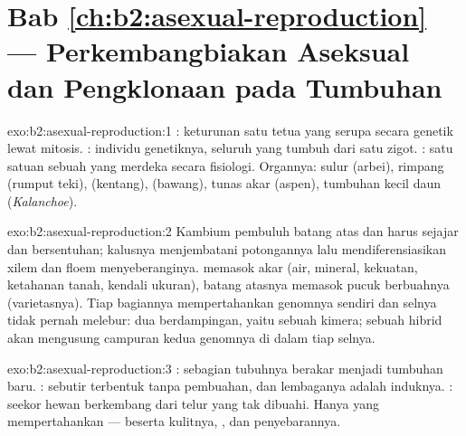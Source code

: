 \section*{Bab \ref{ch:b2:asexual-reproduction} --- Perkembangbiakan Aseksual dan Pengklonaan pada Tumbuhan}

\begin{solution}{exo:b2:asexual-reproduction:1}
: keturunan satu tetua yang serupa secara genetik lewat mitosis.
: individu genetiknya, seluruh yang tumbuh dari satu zigot.
: satu satuan sebuah  yang merdeka secara fisiologi.
Organnya: sulur (arbei), rimpang (rumput teki),  (kentang),
 (bawang), tunas akar (aspen), tumbuhan kecil daun
(\emph{Kalanchoe}).
\end{solution}

\begin{solution}{exo:b2:asexual-reproduction:2}
Kambium pembuluh batang atas dan  harus sejajar dan
bersentuhan; kalusnya menjembatani potongannya lalu
mendiferensiasikan xilem dan floem menyeberanginya. 
memasok akar (air, mineral, kekuatan, ketahanan tanah, kendali ukuran),
batang atasnya memasok pucuk berbuahnya (varietasnya). Tiap bagiannya
mempertahankan genomnya sendiri dan selnya tidak pernah melebur: dua
 berdampingan, yaitu sebuah kimera; sebuah hibrid akan
mengusung campuran kedua genomnya di dalam tiap selnya.
\end{solution}

\begin{solution}{exo:b2:asexual-reproduction:3}
: sebagian tubuhnya berakar menjadi tumbuhan
baru. : sebutir  terbentuk tanpa pembuahan, dan lembaganya
adalah  induknya. : seekor hewan berkembang dari
telur yang tak dibuahi. Hanya  yang mempertahankan  ---
beserta kulitnya, , dan penyebarannya.
\end{solution}

